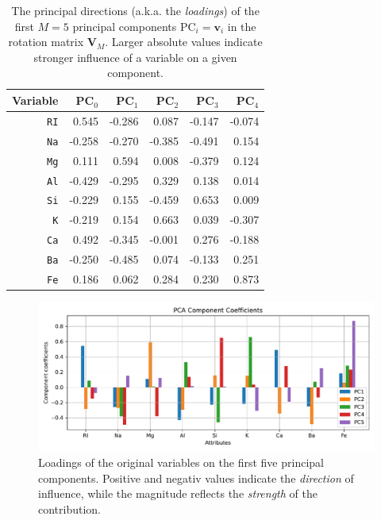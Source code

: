 \documentclass[dtu]{dtuarticle}
\begin{document}
	\begin{table}[h!]
		\centering
		\begin{tabular}{r | *{5}{|r}}
			\textbf{Variable} & $\textbf{PC}_0$ & $\textbf{PC}_1$ & $\textbf{PC}_2$ & $\textbf{PC}_3$ & $\textbf{PC}_4$ \\ \hline\hline
			\texttt{RI} & \num{0.545}     &          -0.286 &           0.087 &          -0.147 &          -0.074 \\
			\texttt{Na} & -0.258          &          -0.270 &          -0.385 &          -0.491 &           0.154 \\
			\texttt{Mg} & 0.111           &           0.594 &           0.008 &          -0.379 &           0.124 \\
			\texttt{Al} & -0.429          &          -0.295 &           0.329 &           0.138 &           0.014 \\
			\texttt{Si} & -0.229          &           0.155 &          -0.459 &           0.653 &           0.009 \\
			\texttt{K} & -0.219          &           0.154 &           0.663 &           0.039 &          -0.307 \\
			\texttt{Ca} & 0.492           &          -0.345 &          -0.001 &           0.276 &          -0.188 \\
			\texttt{Ba} & -0.250          &          -0.485 &           0.074 &          -0.133 &           0.251 \\
			\texttt{Fe} & 0.186           &           0.062 &           0.284 &           0.230 &           0.873
		\end{tabular}
		\caption{The principal directions (a.k.a. the \textit{loadings}) of the first $M=5$ principal components $\text{PC}_i = \bm{v}_i$ in the rotation matrix $\bm{V}_M$. Larger absolute values indicate stronger influence of a variable on a given component.}
		\label{table:loadings}
	\end{table}

	\begin{figure}
		\centering
		\includegraphics[width=.99\textwidth]{figures/pca_component_coefficients}
		\caption{Loadings of the original variables on the first five principal components. Positive and negativ values indicate the \textit{direction} of influence, while the magnitude reflects the \textit{strength} of the contribution.}
		\label{fig:pc-components}
	\end{figure}
\end{document}

